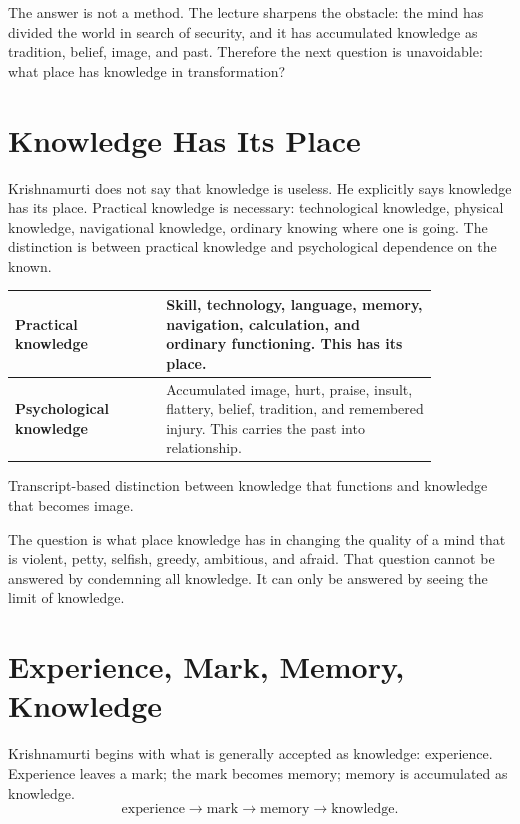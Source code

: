 \documentclass[11pt,oneside]{book}
\begin{document}
The answer is not a method. The lecture sharpens the obstacle: the mind has divided the world in search of security, and it has accumulated knowledge as tradition, belief, image, and past. Therefore the next question is unavoidable: what place has knowledge in transformation?

\section{Knowledge Has Its Place}

Krishnamurti does not say that knowledge is useless. He explicitly says knowledge has its place. Practical knowledge is necessary: technological knowledge, physical knowledge, navigational knowledge, ordinary knowing where one is going. The distinction is between practical knowledge and psychological dependence on the known.

\begin{table}
\centering
\begin{tabular}{|p{0.30\linewidth}|p{0.54\linewidth}|}
\hline
\textbf{Practical knowledge} & Skill, technology, language, memory, navigation, calculation, and ordinary functioning. This has its place.\\
\hline
\textbf{Psychological knowledge} & Accumulated image, hurt, praise, insult, flattery, belief, tradition, and remembered injury. This carries the past into relationship.\\
\hline
\end{tabular}

Transcript-based distinction between knowledge that functions and knowledge that becomes image.
\end{table}

The question is what place knowledge has in changing the quality of a mind that is violent, petty, selfish, greedy, ambitious, and afraid. That question cannot be answered by condemning all knowledge. It can only be answered by seeing the limit of knowledge.

\section{Experience, Mark, Memory, Knowledge}

Krishnamurti begins with what is generally accepted as knowledge: experience. Experience leaves a mark; the mark becomes memory; memory is accumulated as knowledge.
\begin{equation}
\text{experience}
\longrightarrow
\text{mark}
\longrightarrow
\text{memory}
\longrightarrow
\text{knowledge}.
\end{equation}
\end{document}
